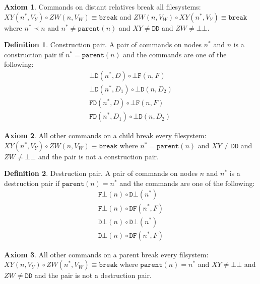 \documentclass[12pt]{article}
\newcommand{\empt}{\bot}
\newcommand{\parent}{\mathtt{parent}}
\newcommand{\nn}{n^*} %
\newcommand{\cbrk}{\mathtt{break}}
\newcommand{\fscommand}[2]{{#1#2}}
\newcommand{\fsregcommandchar}[1]{\mathtt{#1}}
\newcommand{\fsregcommand}[2]{\fscommand{\fsregcommandchar{#1}}{\fsregcommandchar{#2}}}
\newcommand{\cbb}{\fsregcommand{\empt}{\empt}}
\newcommand{\cbf}{\fsregcommand{\empt}{F}}
\newcommand{\cbd}{\fsregcommand{\empt}{D}}
\newcommand{\cfb}{\fsregcommand{F}{\empt}}
\newcommand{\cfd}{\fsregcommand{F}{D}}
\newcommand{\cdb}{\fsregcommand{D}{\empt}}
\newcommand{\cdf}{\fsregcommand{D}{F}}
\newcommand{\cdd}{\fsregcommand{D}{D}}
\newcommand{\cxy}{\fscommand{X}{Y}}
\newcommand{\czw}{\fscommand{Z}{W}}
\newcommand{\cc}{\circ} %
\newcommand{\descendant}{\prec}
\theoremstyle{definition}
\newtheorem{mydef}{Definition}
\newtheorem{myax}{Axiom}
\begin{document}
\begin{myax}\label{ax_distantrel_breaks}
Commands on distant relatives break all filesystems:
$\cxy(\nn,V_Y)\cc  \czw(n,V_W) \equiv \cbrk$
and $\czw(n,V_W)\cc \cxy(\nn,V_Y) \equiv\cbrk$
where $\nn\descendant n$ and $\nn\neq\parent(n)$ and $\cxy\neq\cdd$ and $\czw\neq\cbb$.
\end{myax}

\begin{mydef}{Construction pair.}
A pair of commands on nodes $\nn$ and $n$ is a construction pair if $\nn=\parent(n)$ and the commands are one
of the following:
   \begin{gather*}
            \cbd(\nn, D)\cc  \cbf(n, F) \\
            \cbd(\nn, D_1)\cc  \cbd(n, D_2) \\
            \cfd(\nn, D)\cc  \cbf(n, F) \\
            \cfd(\nn, D_1)\cc  \cbd(n, D_2)
   \end{gather*}
\end{mydef}

\begin{myax}\label{ax_directchild_breaks}
All other commands on a child break every filesystem:
$\cxy(\nn,V_Y)\cc  \czw(n,V_W) \equiv \cbrk$ where $\nn=\parent(n)$ and $\cxy\neq\cdd$ and $\czw\neq\cbb$
and the pair is not a construction pair.
\end{myax}

\begin{mydef}{Destruction pair.}
A pair of commands on nodes $n$ and $\nn$ is a destruction pair if $\parent(n)=\nn$ and the commands are one
of the following:
   \begin{gather*}
            \cfb(n)\cc  \cdb(\nn) \\
            \cfb(n)\cc  \cdf(\nn, F) \\
            \cdb(n)\cc  \cdb(\nn) \\
            \cdb(n)\cc  \cdf(\nn, F)
   \end{gather*}
\end{mydef}

\begin{myax}\label{ax_directparent_breaks}
All other commands on a parent break every filsystem:
$\cxy(n,V_Y)\cc  \czw(\nn,V_W) \equiv \cbrk$ where $\parent(n)=\nn$ and $\cxy\neq\cbb$ and $\czw\neq\cdd$
and the pair is not a destruction pair.
\end{myax}
\end{document}
